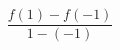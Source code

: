 \documentclass[preview]{standalone}
\begin{document}
\begin{align*}
\dfrac{f(1) - f(-1)}{1 - (-1)}
\end{align*}
\end{document}
